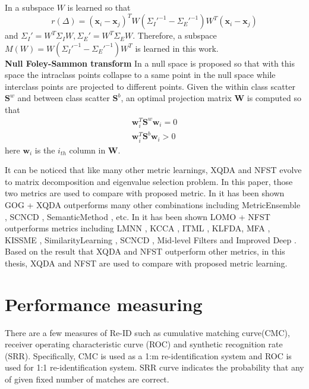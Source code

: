 In \cite{LOMO} a subspace $W$ is learned so that 
\begin{equation}
r(\Delta) = (\bm{x}_i - \bm{x}_j)^TW({\Sigma_I}'^{-1} - {\Sigma_E}'^{-1})W^T(\bm{x}_i - \bm{x}_j)
\end{equation}
and ${\Sigma_I}' = W^T\Sigma_IW, {\Sigma_E}' = W^T\Sigma_EW$. Therefore, a subspace $M(W) = W({\Sigma_I}'^{-1} - {\Sigma_E}'^{-1})W^T$ is learned in this work.\\
\indent \textbf{Null Foley-Sammon transform} In \cite{NFST} a null space is proposed so that with this space the intraclass points collapse to a same point in the null space while interclass points are projected to different points. Given the within class scatter $\bm{S}^w$ and between class scatter $\bm{S}^b$, an optimal projection matrix $\bm{W}$ is computed so that 
\begin{equation}
\begin{aligned}
\bm{w}_i^T\bm{S}^w\bm{w}_i = 0\\
\bm{w}_i^T\bm{S}^b\bm{w}_i > 0
\end{aligned}
\end{equation}
here $\bm{w}_i$ is the $i_{th}$ column in $\bm{W}$.

It can be noticed that like many other metric learnings, XQDA and NFST evolve to matrix decomposition and eigenvalue selection problem. In this paper, those two metrics are used to compare with proposed metric. In \cite{GOG} it has been shown GOG + XQDA outperforms many other combinations including MetricEnsemble \cite{MetricEnsembles}, SCNCD \cite{SCNCD}, SemanticMethod \cite{SemanticMethod}, etc. In \cite{ NFST} it has been shown LOMO + NFST outperforms metrics including LMNN \cite{LMNN}, KCCA \cite{KCCA}, ITML \cite{ITML}, KLFDA\cite{KLFDA}, MFA \cite{KernelVersionMetrics}, KISSME \cite{KISSME}, SimilarityLearning \cite{SimilarityLearning}, SCNCD \cite{SCNCD}, Mid-level Filters \cite{MidlevelFilters} and Improved Deep \cite{ImprovedCNN}. Based on the result that XQDA and NFST outperform other metrics, in this thesis, XQDA and NFST are used to compare with proposed metric learning. 

\section{Performance measuring}
There are a few measures of Re-ID such as cumulative matching curve(CMC), receiver operating characteristic curve (ROC) and synthetic recognition rate (SRR). Specifically, CMC is used as a 1:m re-identification system and ROC is used for 1:1 re-identification system. SRR curve indicates the probability that any of given fixed number of matches are correct.

